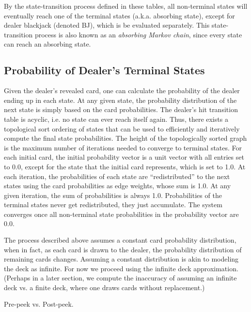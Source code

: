 By the state-transition process defined in these tables,
all non-terminal states will eventually reach
one of the terminal states (a.k.a. absorbing state), 
except for dealer blackjack (denoted BJ), 
which is be evaluated separately.
This state-transition process is also known as an
\emph{absorbing Markov chain},
since every state can reach an absorbing state.


\subsection{Probability of Dealer's Terminal States}
\label{sec:rules:dealer-play:final-pdf}

Given the dealer's revealed card, 
one can calculate the probability of the dealer ending up in each state.
At any given state, the probability distribution of the
next state is simply based on the card probabilities.  
The dealer's hit transition table is acyclic, i.e. 
no state can ever reach itself again.  
Thus, there exists a topological sort
ordering of states that can be used to efficiently and iteratively 
compute the final state probabilities.
The height of the topologically sorted graph is the maximum 
number of iterations needed to converge to terminal states.
For each initial card, the initial probability vector
is a unit vector with all entries set to 0.0, except for the state
that the initial card represents, which is set to 1.0.
At each iteration, the probabilities of each state are 
``redistributed'' to the next states using the 
card probabilities as edge weights, whose sum is 1.0.  
At any given iteration, the sum of probabilities is always 1.0.
Probabilities of the terminal states never get redistributed, 
they just accumulate.  
The system converges once all non-terminal state probabilities 
in the probability vector are 0.0.

The process described above assumes a constant 
card probability distribution, 
when in fact, as each card is drawn to the dealer, 
the probability distribution of remaining cards changes.
Assuming a constant distribution is akin to modeling
the deck as infinite.
For now we proceed using the infinite deck approximation.  
(Perhaps in a later section, we compute the inaccuracy of
assuming an infinite deck vs. a finite deck, where one 
draws cards without replacement.)

Pre-peek vs. Post-peek.

